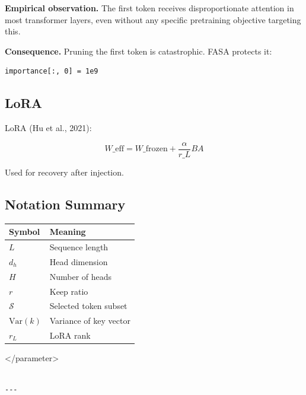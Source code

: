 \textbf{Empirical observation.} The first token receives disproportionate 
attention in most transformer layers, even without any specific pretraining 
objective targeting this.

\textbf{Consequence.} Pruning the first token is catastrophic. FASA protects it:

\begin{lstlisting}
importance[:, 0] = 1e9
\end{lstlisting}

\subsection{LoRA}

LoRA (Hu et al., 2021):

\[
W\_{\text{eff}} = W\_{\text{frozen}} + \frac{\alpha}{r\_L} BA
\tag{3.4}
\]

Used for recovery after injection.

\subsection{Notation Summary}

\begin{table}[H]
\centering
\small
\begin{tabular}{ll}
\toprule
\textbf{Symbol} & \textbf{Meaning} \\
\midrule
$L$ & Sequence length \\
$d_h$ & Head dimension \\
$H$ & Number of heads \\
$r$ & Keep ratio \\
$\mathcal{S}$ & Selected token subset \\
$\text{Var}(k)$ & Variance of key vector \\
$r_L$ & LoRA rank \\
\bottomrule
\end{tabular}
\end{table}
\textless{}/parameter\textgreater{}
\begin{lstlisting}

---
\end{lstlisting}
